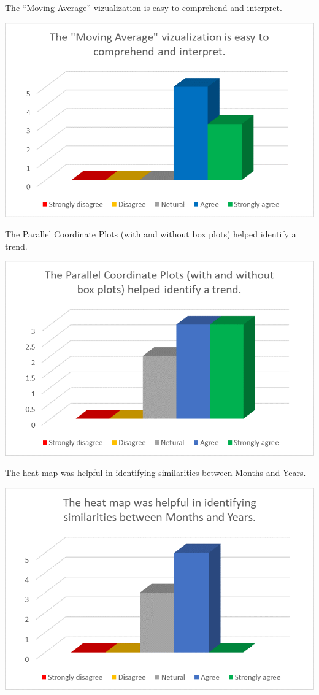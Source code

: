 \documentclass[]{article}
\begin{document}
The ``Moving Average'' vizualization is easy to comprehend and
interpret.\\

\begin{center}\includegraphics[width=0.8\linewidth]{Ex2/figures/q4} \end{center}

The Parallel Coordinate Plots (with and without box plots) helped
identify a trend.\\

\begin{center}\includegraphics[width=0.8\linewidth]{Ex2/figures/q5} \end{center}

The heat map was helpful in identifying similarities between Months and
Years.

\begin{center}\includegraphics[width=0.8\linewidth]{Ex2/figures/q6} \end{center}
\end{document}
